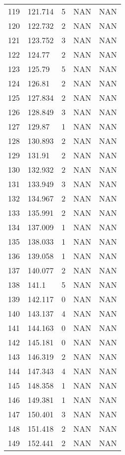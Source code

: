 \documentclass{article}
\begin{document}
\begin{longtable}{@{}lllll@{}}
					119 & 121.714 & 5     & NAN   & NAN   \\
					120 & 122.732 & 2     & NAN   & NAN   \\
					121 & 123.752 & 3     & NAN   & NAN   \\
					122 & 124.77  & 2     & NAN   & NAN   \\
					123 & 125.79  & 5     & NAN   & NAN   \\
					124 & 126.81  & 2     & NAN   & NAN   \\
					125 & 127.834 & 2     & NAN   & NAN   \\
					126 & 128.849 & 3     & NAN   & NAN   \\
					127 & 129.87  & 1     & NAN   & NAN   \\
					128 & 130.893 & 2     & NAN   & NAN   \\
					129 & 131.91  & 2     & NAN   & NAN   \\
					130 & 132.932 & 2     & NAN   & NAN   \\
					131 & 133.949 & 3     & NAN   & NAN   \\
					132 & 134.967 & 2     & NAN   & NAN   \\
					133 & 135.991 & 2     & NAN   & NAN   \\
					134 & 137.009 & 1     & NAN   & NAN   \\
					135 & 138.033 & 1     & NAN   & NAN   \\
					136 & 139.058 & 1     & NAN   & NAN   \\
					137 & 140.077 & 2     & NAN   & NAN   \\
					138 & 141.1   & 5     & NAN   & NAN   \\
					139 & 142.117 & 0     & NAN   & NAN   \\
					140 & 143.137 & 4     & NAN   & NAN   \\
					141 & 144.163 & 0     & NAN   & NAN   \\
					142 & 145.181 & 0     & NAN   & NAN   \\
					143 & 146.319 & 2     & NAN   & NAN   \\
					144 & 147.343 & 4     & NAN   & NAN   \\
					145 & 148.358 & 1     & NAN   & NAN   \\
					146 & 149.381 & 1     & NAN   & NAN   \\
					147 & 150.401 & 3     & NAN   & NAN   \\
					148 & 151.418 & 2     & NAN   & NAN   \\
					149 & 152.441 & 2     & NAN   & NAN   \\

\end{longtable}
\end{document}
